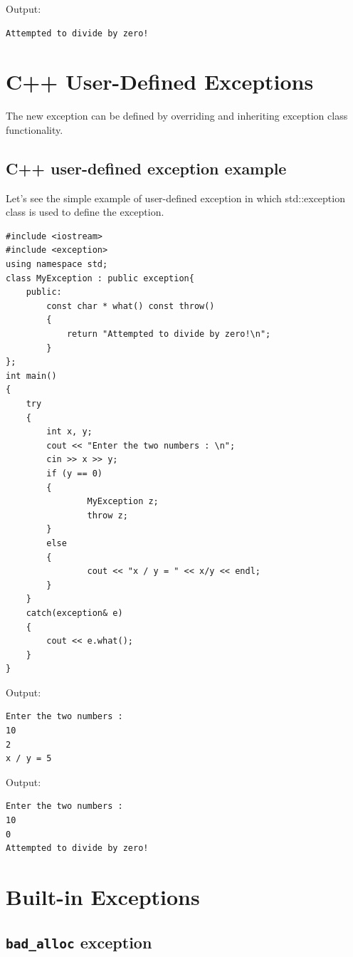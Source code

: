 \documentclass{book}
\begin{document}
Output:

\begin{verbatim}
Attempted to divide by zero!
\end{verbatim}

\section{C++ User-Defined Exceptions}

The new exception can be defined by overriding and inheriting exception class functionality.

\subsection{C++ user-defined exception example}

Let's see the simple example of user-defined exception in which std::exception class is used to define the exception.

\begin{lstlisting}
#include <iostream>  
#include <exception>  
using namespace std;  
class MyException : public exception{  
	public:  
		const char * what() const throw()  
		{  
			return "Attempted to divide by zero!\n";  
		}  
};  
int main()  
{  
	try  
	{  
		int x, y;  
		cout << "Enter the two numbers : \n";  
		cin >> x >> y;  
		if (y == 0)  
		{  
				MyException z;  
				throw z;  
		}  
		else  
		{  
				cout << "x / y = " << x/y << endl;  
		}  
	}  
	catch(exception& e)  
	{  
		cout << e.what();  
	}  
}  
\end{lstlisting}

Output:

\begin{verbatim}
Enter the two numbers :
10
2
x / y = 5  

\end{verbatim}

Output:

\begin{verbatim}
Enter the two numbers :
10
0
Attempted to divide by zero!

\end{verbatim}

\section{Built-in Exceptions}

\subsection{\texttt{bad\_alloc} exception}
\end{document}
